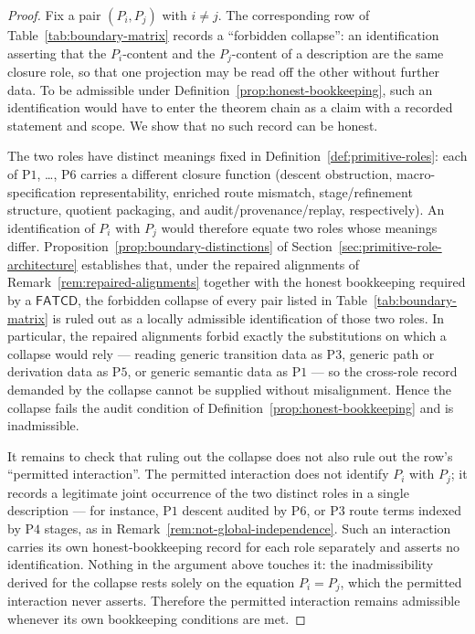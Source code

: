 \documentclass[11pt]{article}
\theoremstyle{definition}
\newcommand{\FATCD}{\ensuremath{\mathsf{FATCD}}}
\newcommand{\Pone}{\ensuremath{\mathrm{P1}}}
\newcommand{\Pthree}{\ensuremath{\mathrm{P3}}}
\newcommand{\Pfour}{\ensuremath{\mathrm{P4}}}
\newcommand{\Pfive}{\ensuremath{\mathrm{P5}}}
\newcommand{\Psix}{\ensuremath{\mathrm{P6}}}
\begin{document}
\begin{proof}
Fix a pair \((P_i, P_j)\) with \(i \ne j\). The corresponding row of
Table~\ref{tab:boundary-matrix} records a ``forbidden collapse'': an
identification asserting that the \(P_i\)-content and the
\(P_j\)-content of a description are the same closure role, so that one
projection may be read off the other without further data. To be
admissible under Definition~\ref{prop:honest-bookkeeping}, such an
identification would have to enter the theorem chain as a claim with a
recorded statement and scope. We show that no such record can be
honest.

The two roles have distinct meanings fixed in
Definition~\ref{def:primitive-roles}: each of \Pone{}, \ldots, \Psix{}
carries a different closure function (descent obstruction,
macro-specification representability, enriched route mismatch,
stage/refinement structure, quotient packaging, and
audit/provenance/replay, respectively). An identification of \(P_i\)
with \(P_j\) would therefore equate two roles whose meanings differ.
Proposition~\ref{prop:boundary-distinctions} of
Section~\ref{sec:primitive-role-architecture} establishes that, under
the repaired alignments of Remark~\ref{rem:repaired-alignments}
together with the honest bookkeeping required by a \FATCD{}, the
forbidden collapse of every pair listed in
Table~\ref{tab:boundary-matrix} is ruled out as a locally admissible
identification of those two roles. In particular, the repaired
alignments forbid exactly the substitutions on which a collapse would
rely --- reading generic transition data as \Pthree{}, generic
path or derivation data as \Pfive{}, or generic semantic data as
\Pone{} --- so the cross-role record demanded by the collapse cannot be
supplied without misalignment. Hence the collapse fails the audit
condition of Definition~\ref{prop:honest-bookkeeping} and is
inadmissible.

It remains to check that ruling out the collapse does not also rule out
the row's ``permitted interaction''. The permitted interaction does not
identify \(P_i\) with \(P_j\); it records a legitimate joint occurrence
of the two distinct roles in a single description --- for instance,
\Pone{} descent audited by \Psix{}, or \Pthree{} route terms indexed by
\Pfour{} stages, as in Remark~\ref{rem:not-global-independence}. Such
an interaction carries its own honest-bookkeeping record for each role
separately and asserts no identification. Nothing in the argument above
touches it: the inadmissibility derived for the collapse rests solely
on the equation \(P_i = P_j\), which the permitted interaction never
asserts. Therefore the permitted interaction remains admissible
whenever its own bookkeeping conditions are met.
\end{proof}
\end{document}
